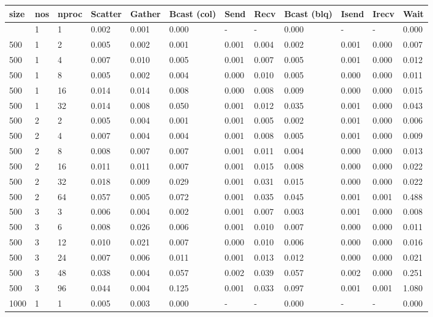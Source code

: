 \begin{longtable}[]{@{}llllllllllll@{}}
\toprule\noalign{}
size & nos & nproc & Scatter & Gather & Bcast (col) & Send & Recv &
Bcast (blq) & Isend & Irecv & Wait \\
\midrule\noalign{}
\endhead
\bottomrule\noalign{}
\endlastfoot
500 & 1 & 1 & 0.002 & 0.001 & 0.000 & - & - & 0.000 & - & - & 0.000 \\
500 & 1 & 2 & 0.005 & 0.002 & 0.001 & 0.001 & 0.004 & 0.002 & 0.001 &
0.000 & 0.007 \\
500 & 1 & 4 & 0.007 & 0.010 & 0.005 & 0.001 & 0.007 & 0.005 & 0.001 &
0.000 & 0.012 \\
500 & 1 & 8 & 0.005 & 0.002 & 0.004 & 0.000 & 0.010 & 0.005 & 0.000 &
0.000 & 0.011 \\
500 & 1 & 16 & 0.014 & 0.014 & 0.008 & 0.000 & 0.008 & 0.009 & 0.000 &
0.000 & 0.015 \\
500 & 1 & 32 & 0.014 & 0.008 & 0.050 & 0.001 & 0.012 & 0.035 & 0.001 &
0.000 & 0.043 \\
500 & 2 & 2 & 0.005 & 0.004 & 0.001 & 0.001 & 0.005 & 0.002 & 0.001 &
0.000 & 0.006 \\
500 & 2 & 4 & 0.007 & 0.004 & 0.004 & 0.001 & 0.008 & 0.005 & 0.001 &
0.000 & 0.009 \\
500 & 2 & 8 & 0.008 & 0.007 & 0.007 & 0.001 & 0.011 & 0.004 & 0.000 &
0.000 & 0.013 \\
500 & 2 & 16 & 0.011 & 0.011 & 0.007 & 0.001 & 0.015 & 0.008 & 0.000 &
0.000 & 0.022 \\
500 & 2 & 32 & 0.018 & 0.009 & 0.029 & 0.001 & 0.031 & 0.015 & 0.000 &
0.000 & 0.022 \\
500 & 2 & 64 & 0.057 & 0.005 & 0.072 & 0.001 & 0.035 & 0.045 & 0.001 &
0.001 & 0.488 \\
500 & 3 & 3 & 0.006 & 0.004 & 0.002 & 0.001 & 0.007 & 0.003 & 0.001 &
0.000 & 0.008 \\
500 & 3 & 6 & 0.008 & 0.026 & 0.006 & 0.001 & 0.010 & 0.007 & 0.000 &
0.000 & 0.011 \\
500 & 3 & 12 & 0.010 & 0.021 & 0.007 & 0.000 & 0.010 & 0.006 & 0.000 &
0.000 & 0.016 \\
500 & 3 & 24 & 0.007 & 0.006 & 0.011 & 0.001 & 0.013 & 0.012 & 0.000 &
0.000 & 0.021 \\
500 & 3 & 48 & 0.038 & 0.004 & 0.057 & 0.002 & 0.039 & 0.057 & 0.002 &
0.000 & 0.251 \\
500 & 3 & 96 & 0.044 & 0.004 & 0.125 & 0.001 & 0.033 & 0.097 & 0.001 &
0.001 & 1.080 \\
1000 & 1 & 1 & 0.005 & 0.003 & 0.000 & - & - & 0.000 & - & - & 0.000 \\

\end{longtable}

